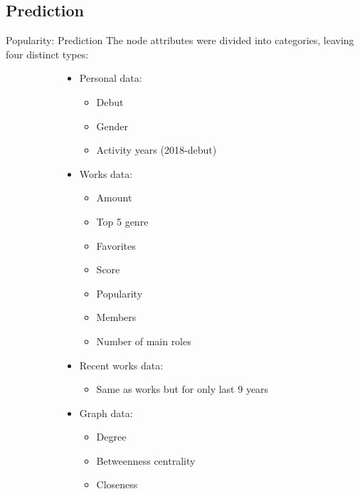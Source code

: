 \subsection{Prediction}
\begin{frame}{Popularity: Prediction}
The node attributes were divided into categories, leaving four distinct types:

\begin{figure}
	\centering
	\begin{subfigure}{.4\columnwidth}
		\begin{itemize}
			\item Personal data:
			\begin{itemize}
				\item Debut
				\item Gender
				\item Activity years (2018-debut)
			\end{itemize}
			\item Works data:
			\begin{itemize}
				\item Amount
				\item Top 5 genre
				\item Favorites
				\item Score
				\item Popularity
				\item Members
				\item Number of main roles
			\end{itemize}
		\end{itemize}
	\end{subfigure}%
	\begin{subfigure}{.6\columnwidth}
		\begin{itemize}
			\item Recent works data:
			\begin{itemize}
				\item Same as works but for only last 9 years
			\end{itemize}	
			\item Graph data:
			\begin{itemize}
				\item Degree
				\item Betweenness centrality
				\item Closeness
			\end{itemize}
		\end{itemize}
	\end{subfigure}
\end{figure}
\end{frame}

